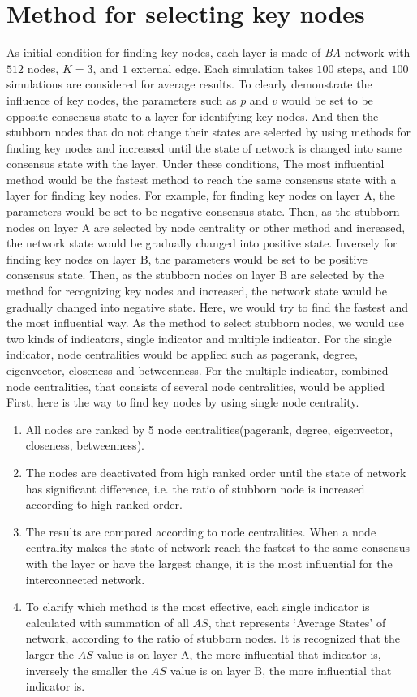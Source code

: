 \section{Method for selecting key nodes}
\label{sec:method for finding key nodes}
As initial condition for finding key nodes, each layer is made of \textit{BA} network with $512$ nodes, $K=3$, and $1$ external edge. Each simulation takes $100$ steps, and $100$ simulations are considered for average results. To clearly demonstrate the influence of key nodes, the parameters such as $p$ and $v$ would be set to be opposite consensus state to a layer for identifying key nodes. And then the stubborn nodes that do not change their states are selected by using methods for finding key nodes and increased until the state of network is changed into same consensus state with the layer. Under these conditions, The most influential method would be the fastest method to reach the same consensus state with a layer for finding key nodes. For example, for finding key nodes on layer A, the parameters would be set to be negative consensus state. Then, as the stubborn nodes on layer A are selected by node centrality or other method and increased, the network state would be gradually changed into positive state. Inversely for finding key nodes on layer B, the parameters would be set to be positive consensus state. Then, as the stubborn nodes on layer B are selected by the method for recognizing key nodes and increased, the network state would be gradually changed into negative state. Here, we would try to find the fastest and the most influential way.
As the method to select stubborn nodes, we would use two kinds of indicators, single indicator and multiple indicator. For the single indicator, node centralities would be applied such as pagerank, degree, eigenvector, closeness and betweenness. For the multiple indicator, combined node centralities, that consists of several node centralities, would be applied   
First, here is the way to find key nodes by using single node centrality.
\begin{enumerate}
	\item All nodes are ranked by 5 node centralities(pagerank, degree, eigenvector, closeness, betweenness).
	\item The nodes are deactivated from high ranked order until the state of network has significant difference, i.e. the ratio of stubborn node is increased according to high ranked order. 
	\item The results are compared according to node centralities. When a node centrality makes the state of network reach the fastest to the same consensus with the layer or have the largest change, it is the most influential for the interconnected network.
	\item To clarify which method is the most effective, each single indicator is calculated with summation of all $AS$, that represents `Average States' of network, according to the ratio of stubborn nodes. It is recognized that the larger the $AS$ value is on layer A, the more influential that indicator is, inversely the smaller the $AS$ value is on layer B, the more influential that indicator is.
\end{enumerate}

